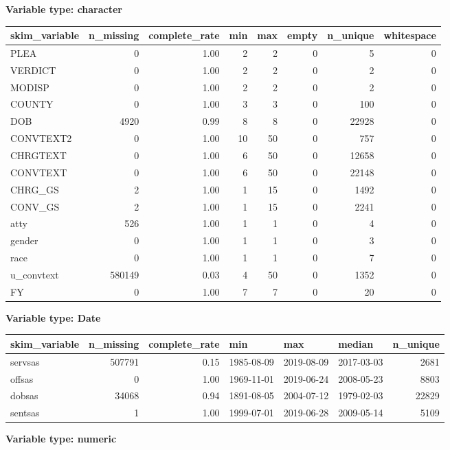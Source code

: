 \documentclass[
]{article}
\begin{document}
\textbf{Variable type: character}

\begin{longtable}[]{@{}lrrrrrrr@{}}
\toprule
skim\_variable & n\_missing & complete\_rate & min & max & empty &
n\_unique & whitespace\tabularnewline
\midrule
\endhead
PLEA & 0 & 1.00 & 2 & 2 & 0 & 5 & 0\tabularnewline
VERDICT & 0 & 1.00 & 2 & 2 & 0 & 2 & 0\tabularnewline
MODISP & 0 & 1.00 & 2 & 2 & 0 & 2 & 0\tabularnewline
COUNTY & 0 & 1.00 & 3 & 3 & 0 & 100 & 0\tabularnewline
DOB & 4920 & 0.99 & 8 & 8 & 0 & 22928 & 0\tabularnewline
CONVTEXT2 & 0 & 1.00 & 10 & 50 & 0 & 757 & 0\tabularnewline
CHRGTEXT & 0 & 1.00 & 6 & 50 & 0 & 12658 & 0\tabularnewline
CONVTEXT & 0 & 1.00 & 6 & 50 & 0 & 22148 & 0\tabularnewline
CHRG\_GS & 2 & 1.00 & 1 & 15 & 0 & 1492 & 0\tabularnewline
CONV\_GS & 2 & 1.00 & 1 & 15 & 0 & 2241 & 0\tabularnewline
atty & 526 & 1.00 & 1 & 1 & 0 & 4 & 0\tabularnewline
gender & 0 & 1.00 & 1 & 1 & 0 & 3 & 0\tabularnewline
race & 0 & 1.00 & 1 & 1 & 0 & 7 & 0\tabularnewline
u\_convtext & 580149 & 0.03 & 4 & 50 & 0 & 1352 & 0\tabularnewline
FY & 0 & 1.00 & 7 & 7 & 0 & 20 & 0\tabularnewline
\bottomrule
\end{longtable}

\textbf{Variable type: Date}

\begin{longtable}[]{@{}lrrlllr@{}}
\toprule
skim\_variable & n\_missing & complete\_rate & min & max & median &
n\_unique\tabularnewline
\midrule
\endhead
servsas & 507791 & 0.15 & 1985-08-09 & 2019-08-09 & 2017-03-03 &
2681\tabularnewline
offsas & 0 & 1.00 & 1969-11-01 & 2019-06-24 & 2008-05-23 &
8803\tabularnewline
dobsas & 34068 & 0.94 & 1891-08-05 & 2004-07-12 & 1979-02-03 &
22829\tabularnewline
sentsas & 1 & 1.00 & 1999-07-01 & 2019-06-28 & 2009-05-14 &
5109\tabularnewline
\bottomrule
\end{longtable}

\textbf{Variable type: numeric}
\end{document}

